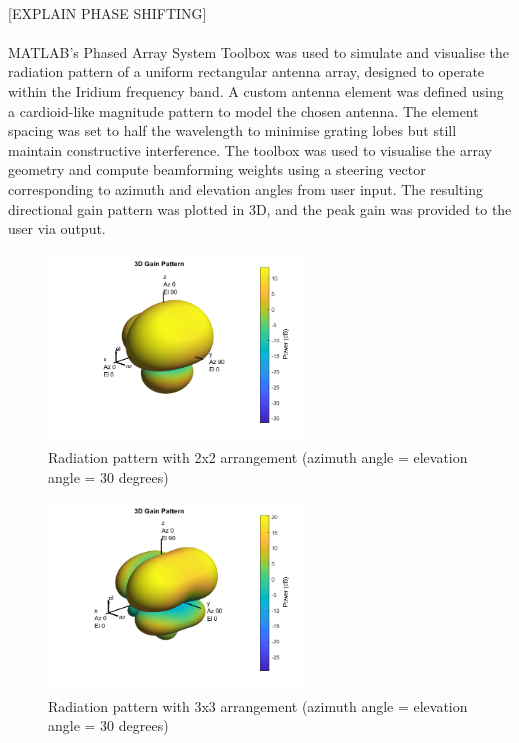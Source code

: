 \documentclass[11pt]{article}
\begin{document}
	\paragraph{} [EXPLAIN PHASE SHIFTING]
	
	\paragraph{} MATLAB's Phased Array System Toolbox was used to simulate and visualise the radiation pattern of a uniform rectangular antenna array, designed to operate within the Iridium frequency band. A custom antenna element was defined using a cardioid-like magnitude pattern to model the chosen antenna. The element spacing was set to half the wavelength to minimise grating lobes but still maintain constructive interference. The toolbox was used to visualise the array geometry and compute beamforming weights using a steering vector corresponding to azimuth and elevation angles from user input. The resulting directional gain pattern was plotted in 3D, and the peak gain was provided to the user via output.
	
	\begin{figure}[H]
		\centering
		\includegraphics[width=0.6\textwidth]{2patt.png}
		\caption{Radiation pattern with 2x2 arrangement (azimuth angle = elevation angle = 30 degrees)}
	\end{figure}
	
	\begin{figure}[H]
		\centering
		\includegraphics[width=0.6\textwidth]{3patt.png}
		\caption{Radiation pattern with 3x3 arrangement (azimuth angle = elevation angle = 30 degrees)}
	\end{figure}
	
\end{document}

